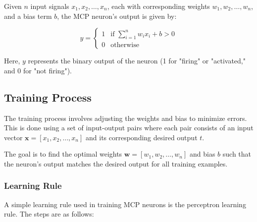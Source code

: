 \documentclass[english]{article}
\begin{document}
Given \( n \) input signals \( x_1, x_2, \ldots, x_n \), each with corresponding weights \( w_1, w_2, \ldots, w_n \), and a bias term \( b \), the MCP neuron's output is given by:

\[
y = 
\begin{cases} 
1 & \text{if } \sum_{i=1}^{n} w_i x_i + b > 0 \\
0 & \text{otherwise}
\end{cases}
\]

Here, \( y \) represents the binary output of the neuron (1 for "firing" or "activated," and 0 for "not firing").

\subsection{Training Process}

The training process involves adjusting the weights and bias to minimize errors. This is done using a set of input-output pairs where each pair consists of an input vector \( \mathbf{x} = [x_1, x_2, \ldots, x_n] \) and its corresponding desired output \( t \).

The goal is to find the optimal weights \( \mathbf{w} = [w_1, w_2, \ldots, w_n] \) and bias \( b \) such that the neuron's output matches the desired output for all training examples.

\subsubsection{Learning Rule}

A simple learning rule used in training MCP neurons is the perceptron learning rule. The steps are as follows:
\end{document}
